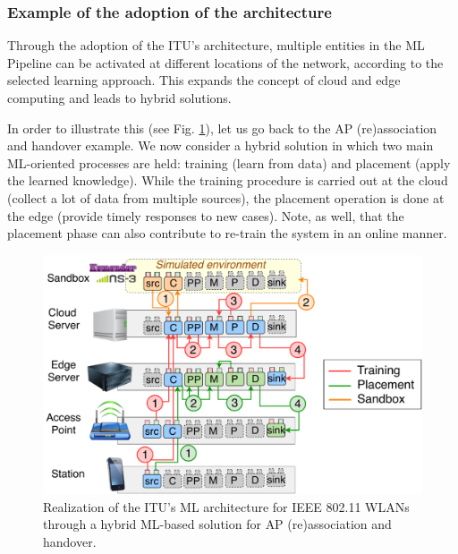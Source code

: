 \documentclass[twocolumn]{article}
\begin{document}

\subsubsection{Example of the adoption of the architecture}
Through the adoption of the ITU's architecture, multiple entities in the ML Pipeline can be activated at different locations of the network, according to the selected learning approach. This expands the concept of cloud and edge computing and leads to hybrid solutions.%

In order to illustrate this (see Fig. \ref{fig:ml_architecture_wlan}), let us go back to the AP (re)association and handover example. We now consider a hybrid solution in which two main ML-oriented processes are held: training (learn from data) and placement (apply the learned knowledge). While the training procedure is carried out at the cloud (collect a lot of data from multiple sources), the placement operation is done at the edge (provide timely responses to new cases). Note, as well, that the placement phase can also contribute to re-train the system in an online manner. %

\begin{figure}[ht!]
\includegraphics[width=1\columnwidth]{ml_architecture_wlan_2}
\caption{Realization of the ITU's ML architecture for IEEE 802.11 WLANs through a hybrid ML-based solution for AP (re)association and handover.}
\label{fig:ml_architecture_wlan}
\end{figure}
\end{document}
